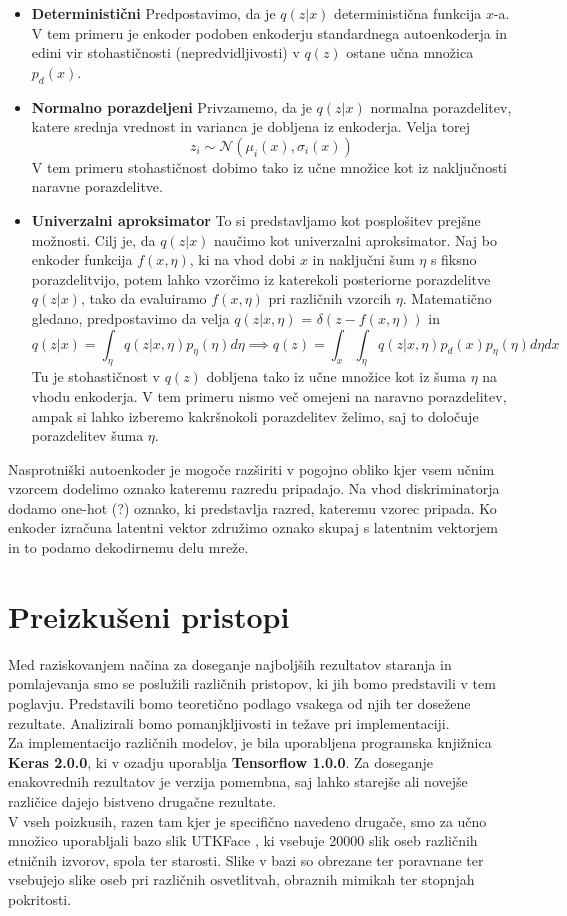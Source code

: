 \documentclass[12pt,a4paper,twoside]{article}
\theoremstyle{definition} %
\theoremstyle{plain} %
\numberwithin{equation}{section}  %
\begin{document}
\begin{itemize}
\item \textbf{Deterministični} Predpostavimo, da je $q(z|x)$ deterministična funkcija $x$-a. V tem primeru je enkoder podoben enkoderju standardnega autoenkoderja in edini vir stohastičnosti (nepredvidljivosti)  v $q(z)$ ostane učna množica $p_d(x)$.
\item \textbf{Normalno porazdeljeni} Privzamemo, da je $q(z|x)$ normalna porazdelitev, katere srednja vrednost in varianca je dobljena iz enkoderja. Velja torej $$z_i \sim \mathcal{N}(\mu_i(x),\sigma_i(x))$$ V tem primeru stohastičnost dobimo tako iz učne množice kot iz naključnosti naravne porazdelitve.
\item \textbf{Univerzalni aproksimator} To si predstavljamo kot posplošitev prejšne možnosti. Cilj je, da  $q(z|x)$ naučimo kot univerzalni aproksimator. Naj bo enkoder funkcija $f(x,\eta)$, ki na vhod dobi $x$ in  naključni šum $\eta$ s fiksno porazdelitvijo, potem lahko vzorčimo iz katerekoli posteriorne porazdelitve $q(z|x)$, tako da evaluiramo $f(x,\eta)$ pri različnih vzorcih 
$\eta$. Matematično gledano, predpostavimo da velja $q(z|x,\eta)$ = $\delta(z-f(x,\eta))$ in 
$$q(z|x) = \int_{\eta} q(z|x,\eta)p_\eta(\eta)d \eta \implies q(z) = \int_x \int_{\eta} q(z|x,\eta)p_{d}(x)p_{\eta}(\eta)d \eta dx $$ 
Tu je stohastičnost  v $q(z)$ dobljena tako iz učne množice kot iz šuma $\eta$ na vhodu enkoderja. V tem primeru nismo več omejeni na naravno porazdelitev, ampak si lahko izberemo kakršnokoli porazdelitev želimo, saj to določuje porazdelitev šuma $\eta$. 
\end{itemize}

Nasprotniški autoenkoder je mogoče razširiti v pogojno obliko kjer vsem učnim vzorcem dodelimo oznako kateremu razredu pripadajo. 
Na vhod diskriminatorja dodamo one-hot (?) oznako, ki predstavlja razred, kateremu vzorec pripada. 
Ko enkoder izračuna latentni vektor združimo oznako skupaj s latentnim vektorjem in to podamo dekodirnemu delu mreže. 

\section{Preizkušeni pristopi}
Med raziskovanjem načina za doseganje najboljših rezultatov staranja in pomlajevanja smo se poslužili različnih pristopov, ki jih bomo predstavili v tem poglavju. Predstavili bomo teoretično podlago vsakega od njih ter dosežene rezultate. Analizirali bomo pomanjkljivosti in težave pri implementaciji.  
\\
Za implementacijo različnih modelov, je bila uporabljena programska knjižnica \textbf{Keras 2.0.0}, ki v ozadju uporablja \textbf{Tensorflow 1.0.0}. Za doseganje enakovrednih rezultatov je verzija pomembna, saj lahko starejše ali novejše različice dajejo bistveno drugačne rezultate. 
\\
V vseh poizkusih, razen tam kjer je specifično navedeno drugače, smo za učno množico uporabljali bazo slik  UTKFace \cite{utkface}, ki vsebuje 20000 slik oseb različnih etničnih izvorov, spola ter starosti. Slike v bazi so obrezane ter poravnane ter vsebujejo slike oseb pri različnih osvetlitvah, obraznih mimikah ter stopnjah pokritosti. 
\end{document}
